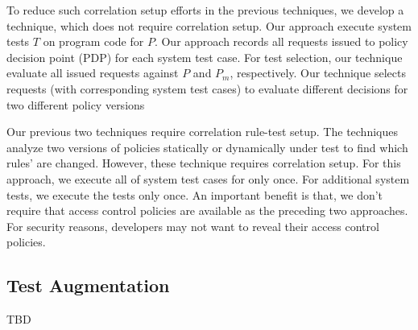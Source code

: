 To reduce such correlation setup efforts in the previous techniques, we develop
a technique, which does not require correlation setup. 
Our approach execute system tests $T$ on program code for $P$. Our approach records all requests issued to policy decision point (PDP) for each system test case. For test selection, our technique evaluate all issued requests against $P$ and $P_m$, respectively.
Our technique selects requests (with corresponding system test cases) to evaluate different decisions for two different policy versions 

Our previous two techniques require correlation rule-test setup. The techniques analyze two versions of policies statically or dynamically 
under test to find which rules' are changed. However, these technique requires correlation setup.
For this approach, we execute all of system test cases for only once. For additional system tests, we
execute the tests only once. An important benefit is that, we don't require that access control policies are available as the preceding two
approaches. For security reasons, developers may not want to reveal their access control policies.



\subsection{Test Augmentation}
TBD








